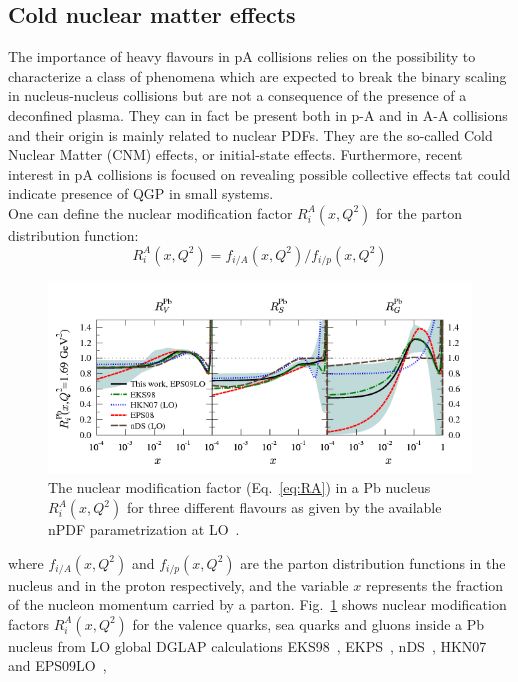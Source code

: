 \subsection{Cold nuclear matter effects}
The importance of heavy flavours in pA collisions relies on the possibility to
characterize a class of phenomena which are expected to break the binary scaling in 
nucleus-nucleus collisions but are not a consequence of the presence of a 
deconfined plasma. They can in fact be present both in p-A and in A-A collisions and
their origin is mainly related to nuclear PDFs. They are the so-called Cold Nuclear Matter (CNM) effects,
or initial-state effects.
Furthermore, recent interest in pA collisions
is focused on revealing possible collective effects tat could indicate presence of QGP in small systems.\\
One can define the nuclear modification factor $R_i^A(x,Q^2)$ for the parton distribution function:
\begin{equation}
\label{eq:RA}
R_i^A(x,Q^2) = f_{i/A}(x,Q^2) / f_{i/p}(x,Q^2)
\end{equation}
\begin{figure}[!ht]
  \centering
  \includegraphics[width=15cm]{FigCap1/PartonNMF.png}
  \caption{The nuclear modification factor (Eq.~\ref{eq:RA}) in a Pb nucleus $R_i^A(x,Q^2)$ for three different flavours as given by the
available nPDF parametrization at LO~\cite{Eskola:2009uj}.}
  \label{fig:nPDF}
\end{figure}
where $f_{i/A}(x,Q^2)$ and $f_{i/p}(x,Q^2)$ are the parton distribution functions in the 
nucleus and in the proton respectively, and the variable $x$ represents the fraction of 
the nucleon momentum carried by a parton. Fig.~\ref{fig:nPDF} 
shows nuclear modification factors $R_i^A(x,Q^2)$ for the valence quarks, sea quarks and 
gluons inside a Pb nucleus from LO global DGLAP calculations EKS98~\cite{Eskola:1998df,Eskola:1998iy}, 
EKPS~\cite{Eskola:2007my},
nDS~\cite{Eskola:2008ca}, HKN07~\cite{Hirai:2007sx} and EPS09LO~\cite{Eskola:2009uj}, 
